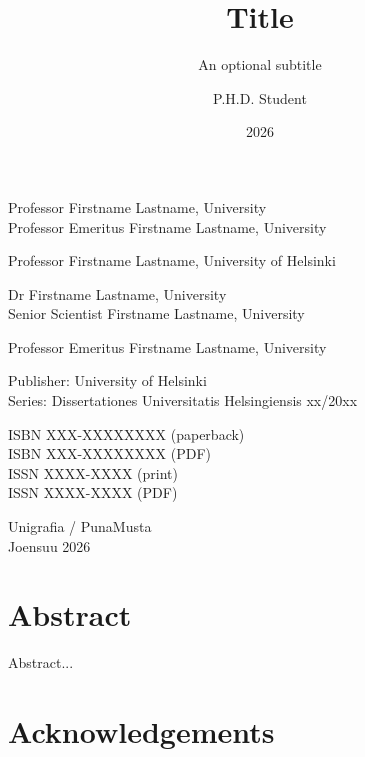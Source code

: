 \documentclass{dissunihel}
\title{Title}
\subtitle{An optional subtitle}
\author{P.H.D. Student}
\date{2026}
\begin{document}
\frontmatter  %
\maketitle

\begin{people}
    \item[Pre-examiners]
    Professor Firstname Lastname, University \\
    Professor Emeritus Firstname Lastname, University
    
    \item[Custos]
    Professor Firstname Lastname, University of Helsinki
    
    \item[Supervisors]
    Dr Firstname Lastname, University \\
    Senior Scientist Firstname Lastname, University
    
    \item[Opponent]
    Professor Emeritus Firstname Lastname, University
\end{people}

\begin{pubinfo}
    Publisher: University of Helsinki\\
    Series: Dissertationes Universitatis Helsingiensis xx/20xx
    
    ISBN XXX-XXXXXXXX (paperback) \\
    ISBN XXX-XXXXXXXX (PDF) \\
    ISSN XXXX-XXXX (print) \\
    ISSN XXXX-XXXX (PDF)
    
    Unigrafia / PunaMusta \\
    Joensuu 2026
\end{pubinfo}

\chapter*{Abstract}\label{ch:abstract}

Abstract...

\chapter*{Acknowledgements}
\end{document}
